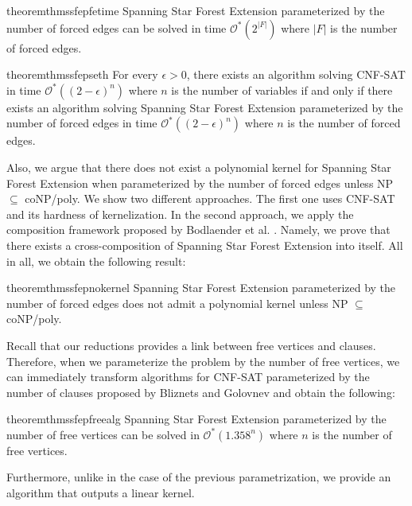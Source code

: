 \documentclass[en]{pracamgr}
\theoremstyle{definition}
\newcommand{\ssfep}{{\sc Spanning Star Forest Extension}}
\newcommand{\cnfsat}{{\sc CNF-SAT}}
\begin{document}
\begin{restatable}{theorem}{thmssfepfetime}\label{thm-ssfep-fe-time}
	\ssfep{} parameterized by the number of forced edges can be solved in time $\mathcal{O}^*(2^{|F|})$ where $|F|$ is the number of forced edges.
\end{restatable}

\begin{restatable}{theorem}{thmssfepseth}\label{thm-ssfep-seth}
	For every $\epsilon > 0$, there exists an algorithm solving \cnfsat{} in time $\mathcal{O}^*((2-\epsilon)^n)$ where $n$ is the number of variables if and only if there exists an algorithm solving \ssfep{} parameterized by the number of forced edges in time $\mathcal{O}^*((2-\epsilon)^n)$ where $n$ is the number of forced edges.
\end{restatable}

\noindent
Also, we argue that there does not exist a polynomial kernel for \ssfep{} when parameterized by the number of forced edges unless NP $\subseteq$ coNP/poly. We show two different approaches. The first one uses \cnfsat{} and its hardness of kernelization. In the second approach, we apply the composition framework proposed by Bodlaender et al. \cite{Bodlaender}. Namely, we prove that there exists a cross-composition of \ssfep{} into itself. All in all, we obtain the following result:

\begin{restatable}{theorem}{thmssfepnokernel}\label{thm-ssfep-nokernel}
	\ssfep{} parameterized by the number of forced edges does not admit a polynomial kernel unless NP $\subseteq$ coNP/poly.
\end{restatable}

Recall that our reductions provides a link between free vertices and clauses. Therefore, when we parameterize the problem by the number of free vertices, we can immediately transform algorithms for \cnfsat{} parameterized by the number of clauses proposed by Bliznets and Golovnev \cite{MAXSAT} and obtain the following:

\begin{restatable}{theorem}{thmssfepfreealg}\label{thm-ssfep-free-alg}
	\ssfep{} parameterized by the number of free vertices can be solved in $\mathcal{O}^*(1.358^n)$ where $n$ is the number of free vertices.
\end{restatable}

\noindent
Furthermore, unlike in the case of the previous parametrization, we provide an algorithm that outputs a linear kernel.
\end{document}
